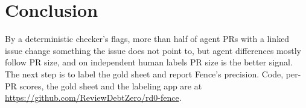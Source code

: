 \documentclass[10pt,conference]{IEEEtran}
\begin{document}
\section{Conclusion}
By a deterministic checker's flags, more than half of agent PRs with a linked issue change something the issue does not point to, but agent differences mostly follow PR size, and on independent human labels PR size is the better signal. The next step is to label the gold sheet and report Fence's precision. Code, per-PR scores, the gold sheet and the labeling app are at \url{https://github.com/ReviewDebtZero/rd0-fence}.



\end{document}
